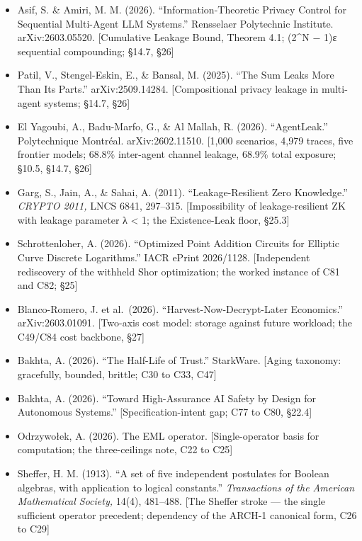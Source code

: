 \documentclass[
]{article}
\providecommand{\tightlist}{%
  \setlength{\itemsep}{0pt}\setlength{\parskip}{0pt}}
\begin{document}
\begin{itemize}
\tightlist
\item
  Asif, S. \& Amiri, M. M. (2026). ``Information-Theoretic Privacy
  Control for Sequential Multi-Agent LLM Systems.'' Rensselaer
  Polytechnic Institute. arXiv:2603.05520. {[}Cumulative Leakage Bound,
  Theorem 4.1; (2\^{}N − 1)ε sequential compounding; §14.7, §26{]}
\item
  Patil, V., Stengel-Eskin, E., \& Bansal, M. (2025). ``The Sum Leaks
  More Than Its Parts.'' arXiv:2509.14284. {[}Compositional privacy
  leakage in multi-agent systems; §14.7, §26{]}
\item
  El Yagoubi, A., Badu-Marfo, G., \& Al Mallah, R. (2026).
  ``AgentLeak.'' Polytechnique Montréal. arXiv:2602.11510. {[}1,000
  scenarios, 4,979 traces, five frontier models; 68.8\% inter-agent
  channel leakage, 68.9\% total exposure; §10.5, §14.7, §26{]}
\item
  Garg, S., Jain, A., \& Sahai, A. (2011). ``Leakage-Resilient Zero
  Knowledge.'' \emph{CRYPTO 2011,} LNCS 6841, 297--315. {[}Impossibility
  of leakage-resilient ZK with leakage parameter λ \textless{} 1; the
  Existence-Leak floor, §25.3{]}
\item
  Schrottenloher, A. (2026). ``Optimized Point Addition Circuits for
  Elliptic Curve Discrete Logarithms.'' IACR ePrint 2026/1128.
  {[}Independent rediscovery of the withheld Shor optimization; the
  worked instance of C81 and C82; §25{]}
\item
  Blanco-Romero, J. et al.~(2026). ``Harvest-Now-Decrypt-Later
  Economics.'' arXiv:2603.01091. {[}Two-axis cost model: storage against
  future workload; the C49/C84 cost backbone, §27{]}
\item
  Bakhta, A. (2026). ``The Half-Life of Trust.'' StarkWare. {[}Aging
  taxonomy: gracefully, bounded, brittle; C30 to C33, C47{]}
\item
  Bakhta, A. (2026). ``Toward High-Assurance AI Safety by Design for
  Autonomous Systems.'' {[}Specification-intent gap; C77 to C80,
  §22.4{]}
\item
  Odrzywołek, A. (2026). The EML operator. {[}Single-operator basis for
  computation; the three-ceilings note, C22 to C25{]}
\item
  Sheffer, H. M. (1913). ``A set of five independent postulates for
  Boolean algebras, with application to logical constants.''
  \emph{Transactions of the American Mathematical Society,} 14(4),
  481--488. {[}The Sheffer stroke --- the single sufficient operator
  precedent; dependency of the ARCH-1 canonical form, C26 to C29{]}

\end{itemize}
\end{document}
